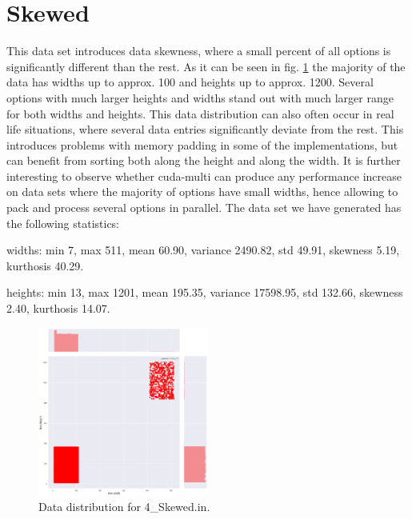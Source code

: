 \section{Skewed}
This data set introduces data skewness, where a small percent of all options is significantly different than the rest. As it can be seen in fig. \ref{fig:data:skewed} the majority of the data has widths up to approx. 100 and heights up to approx. 1200. Several options with much larger heights and widths stand out with much larger range for both widths and heights. This data distribution can also often occur in real life situations, where several data entries significantly deviate from the rest. This introduces problems with memory padding in some of the implementations, but can benefit from sorting both along the height and along the width. It is further interesting to observe whether cuda-multi can produce any performance increase on data sets where the majority of options have small widths, hence allowing to pack and process several options in parallel. The data set we have generated has the following statistics: 

widths: min 7, max 511, mean 60.90, variance 2490.82, std 49.91, skewness 5.19, kurthosis 40.29.

heights: min 13, max 1201, mean 195.35, variance 17598.95, std 132.66, skewness 2.40, kurthosis 14.07.

\begin{figure}[H]
	\centering
	\includegraphics[width=0.5\textwidth]{img/4_SKEWED_plot.png}
	\caption{Data distribution for 4\_Skewed.in.}
	\label{fig:data:skewed}
\end{figure}

